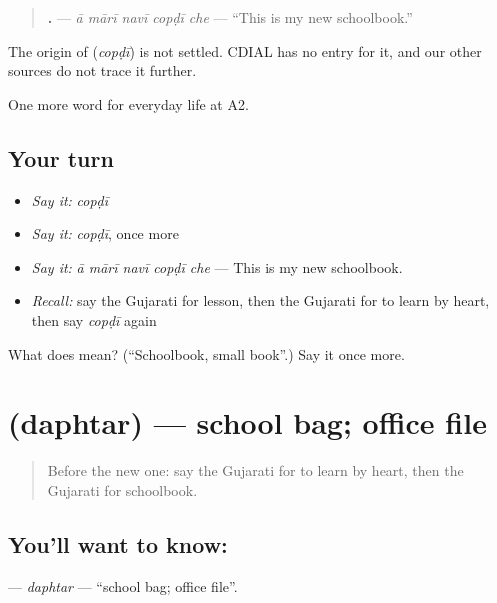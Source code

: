 \begin{quote}
\textbf{    .} — \emph{ā mārī navī copḍī che} — \textquotedblleft{}This is my new schoolbook.\textquotedblright{}
\end{quote}

\begin{cousinweb}
The origin of \textbf{} (\emph{copḍī}) is not settled. CDIAL has no entry for it, and our other sources do not trace it further.
\end{cousinweb}

\begin{grammarlens}[title={What you've built}]
One more word for everyday life at A2.
\end{grammarlens}

\subsection*{Your turn}
\begin{itemize}
\raggedright
  \item \emph{Say it:} \emph{copḍī}
  \item \emph{Say it:} \emph{copḍī}, once more
  \item \emph{Say it:} \emph{ā mārī navī copḍī che} — This is my new schoolbook.
  \item \emph{Recall:} say the Gujarati for lesson, then the Gujarati for to learn by heart, then say \emph{copḍī} again
\end{itemize}

\begin{tcolorbox}[breakable,colback=teal!4,colframe=teal!35!black,title={Before you move on}]
What does  mean? (\textquotedblleft{}Schoolbook, small book\textquotedblright{}.) Say it once more.
\end{tcolorbox}
\section[\texorpdfstring{\gu{દફતર} (daphtar)}{દફતર (daphtar)}]{ (daphtar) — school bag; office file}

\label{lesson:GU-C243-daphtar}



\begin{quote}
Before the new one: say the Gujarati for to learn by heart, then the Gujarati for schoolbook.
\end{quote}

\subsection*{You'll want to know: }
\textbf{} — \emph{daphtar} — \textquotedblleft{}school bag; office file\textquotedblright{}.

